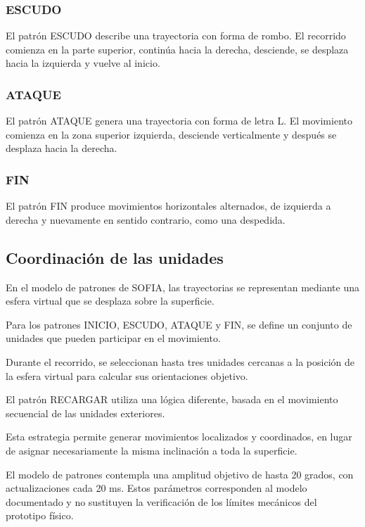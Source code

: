 \documentclass[letterpaper,journal]{IEEEtran}
\begin{document}
\subsubsection{ESCUDO}

El patrón ESCUDO describe una trayectoria
con forma de rombo. El recorrido comienza
en la parte superior, continúa hacia
la derecha, desciende, se desplaza
hacia la izquierda y vuelve al inicio.

\subsubsection{ATAQUE}

El patrón ATAQUE genera una trayectoria
con forma de letra L. El movimiento
comienza en la zona superior izquierda,
desciende verticalmente y después
se desplaza hacia la derecha.

\subsubsection{FIN}

El patrón FIN produce movimientos
horizontales alternados, de izquierda
a derecha y nuevamente en sentido
contrario, como una despedida.

\subsection{Coordinación de las unidades}

En el modelo de patrones de SOFIA,
las trayectorias se representan mediante
una esfera virtual que se desplaza
sobre la superficie.

Para los patrones INICIO, ESCUDO,
ATAQUE y FIN, se define un conjunto
de unidades que pueden participar
en el movimiento.

Durante el recorrido, se seleccionan
hasta tres unidades cercanas a la
posición de la esfera virtual para
calcular sus orientaciones objetivo.

El patrón RECARGAR utiliza una lógica
diferente, basada en el movimiento
secuencial de las unidades exteriores.

Esta estrategia permite generar
movimientos localizados y coordinados,
en lugar de asignar necesariamente
la misma inclinación a toda la superficie.

El modelo de patrones contempla una
amplitud objetivo de hasta 20 grados,
con actualizaciones cada 20 ms.
Estos parámetros corresponden al
modelo documentado y no sustituyen
la verificación de los límites
mecánicos del prototipo físico.
\end{document}
